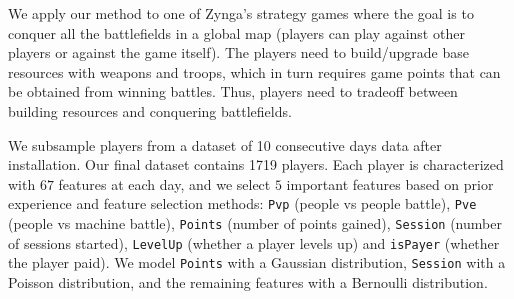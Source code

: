 We apply our method to one of  Zynga's strategy games where the goal is to conquer all the battlefields
in a global map (players can play against other players or against the game itself). The players need to build/upgrade base resources with  weapons and troops, which in turn 
requires game points that can be obtained from winning battles.  Thus,  players need to 
tradeoff between building resources and conquering battlefields.


We subsample players from  a dataset of 10 consecutive days data after installation. Our final dataset contains 1719 players.
Each player is characterized with $67$ features at each day, and we select $5$ important 
features based on prior experience and feature selection methods: \texttt{Pvp} (people vs people battle), 
\texttt{Pve} (people vs machine battle), \texttt{Points} (number of points gained), \texttt{Session} 
(number of sessions started), \texttt{LevelUp} (whether a player levels up) and \texttt{isPayer} (whether
the player paid). We model \texttt{Points} with a Gaussian distribution, \texttt{Session} with a
Poisson distribution, and the remaining features with a Bernoulli distribution.






